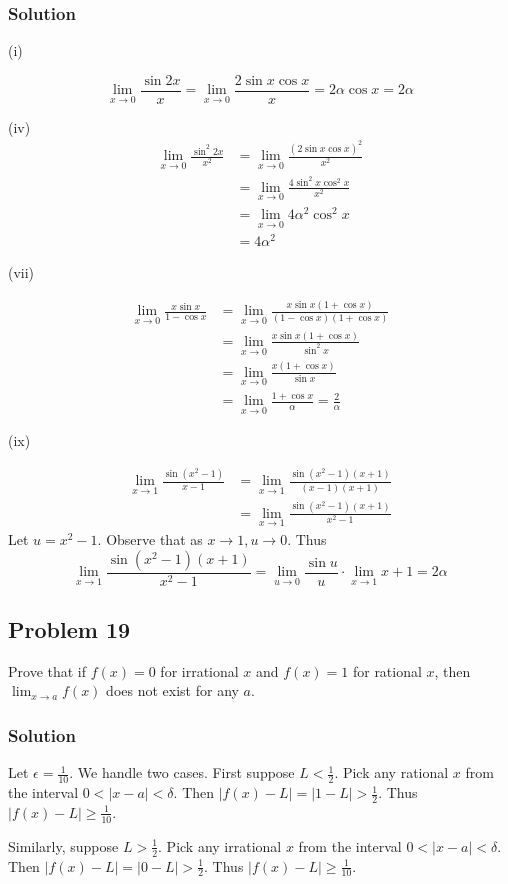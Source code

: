\subsubsection*{Solution}

(i)

\[\lim_{x\to 0}\frac{\sin 2x}{x}=\lim_{x\to 0}\frac{2\sin x\cos x}{x}=2 \alpha \cos x=2\alpha\]

(iv)
\begin{align*}
\lim_{x\to 0}\frac{\sin^2 2x}{x^2}&=\lim_{x\to 0}\frac{(2\sin x\cos x)^2}{x^2}\\
&=\lim_{x\to 0}\frac{4\sin^2x\cos^2x}{x^2}\\
&=\lim_{x\to 0}4\alpha^2\cos^2x\\
&=4\alpha^2
\end{align*}

(vii)

\begin{align*}
    \lim_{x\to 0}\frac{x\sin x}{1-\cos x}&=\lim_{x\to 0}\frac{x\sin x(1+\cos x)}{(1-\cos x)(1+\cos x)}\\
    &=\lim_{x\to 0}\frac{x\sin x(1+\cos x)}{\sin^2 x}\\
    &=\lim_{x\to 0}\frac{x(1+\cos x)}{\sin x}\\
    &=\lim_{x\to 0}\frac{1+\cos x}{\alpha}=\frac{2}{\alpha}
\end{align*}

(ix)

\begin{align*}
    \lim_{x\to 1}\frac{\sin(x^2-1)}{x-1}&=\lim_{x\to 1}\frac{\sin(x^2-1)(x+1)}{(x-1)(x+1)}\\
    &=\lim_{x\to 1}\frac{\sin(x^2-1)(x+1)}{x^2-1}
\end{align*}
Let $u=x^2-1$. Observe that as $x\to 1, u\to 0$. Thus
\[\lim_{x\to 1}\frac{\sin(x^2-1)(x+1)}{x^2-1}=\lim_{u\to 0}\frac{\sin u}{u}\cdot \lim_{x\to 1} x+1=2\alpha\]

\subsection*{Problem 19}
Prove that if $f(x)=0$ for irrational $x$ and $f(x)=1$ for rational $x$, then $\lim_{x\to a}f(x)$ does not exist for any $a$.

\subsubsection*{Solution}
Let $\epsilon=\frac{1}{10}$. We handle two cases. First suppose $L<\frac{1}{2}$. Pick any rational $x$ from the interval $0<|x-a|<\delta$. Then $|f(x)-L|=|1-L|>\frac{1}{2}$. Thus $|f(x)-L|\geq\frac{1}{10}$.

\vs

Similarly, suppose $L>\frac{1}{2}$. Pick any irrational $x$ from the interval $0<|x-a|<\delta$. Then $|f(x)-L|=|0-L|>\frac{1}{2}$. Thus $|f(x)-L|\geq\frac{1}{10}$.

